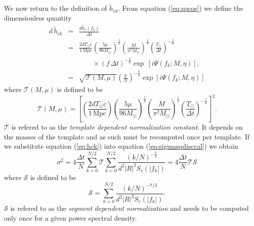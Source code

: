 We now return to the definition of $\tilde{h}_{ck}$.  From equation
(\ref{eq:spcos}) we define the dimensionless quantity
\begin{eqnarray}
\label{eq:hck}
d\,\tilde{h}_{ck} &=& \frac{d \tilde{h}_c(f_k)}{\Delta t} \\
&=& 
\frac{2dT_\odot c}{1\,\mathrm{Mpc}}
\left(\frac{5\mu}{96M_\odot}\right)^\frac{1}{2}
\left(\frac{M}{\pi^2M_\odot}\right)^\frac{1}{3}
\left(\frac{T_\odot}{\Delta t}\right)^{-\frac{1}{6}}\\
&&\quad\quad\times
\left( f\,\Delta t \right)^{-\frac{7}{6}}
\exp\,[i\Psi(f_k;M,\eta)], \nonumber \\
&=&
\sqrt{\mathcal{T}(M,\mu)}\left(\frac{k}{N}\right)^{-\frac{7}{6}}
\exp\left[i\Psi\left(f_k;M,\eta\right)\right]
\end{eqnarray}
where $\mathcal{T}(M,\mu)$ is defined to be
\begin{equation}
\mathcal{T}(M,\mu) = \left[
\left(\frac{2dT_\odot c}{1\,\mathrm{Mpc}}\right)
\left(\frac{5\mu}{96M_\odot}\right)^\frac{1}{2}
\left(\frac{M}{\pi^2M_\odot}\right)^\frac{1}{3}
\left(\frac{T_\odot}{\Delta t}\right)^{-\frac{1}{6}}
\right]^2.
\end{equation}
$\mathcal{T}$ is refered to as the \emph{template dependent normalization
constant}. It depends on the masses of the template and as such must be
recomputed once per template. If we substitute equation (\ref{eq:hck}) 
into equation (\ref{eq:sigmasqdisccal}) we obtain
\begin{equation}
\sigma^2 = 4 \frac{\Delta t}{N} \sum_{k=0}^{N/2} \mathcal{T} 
\sum_{k=0}^{N/2} 
\frac{\left({k}/{N}\right)^{-\frac{7}{3}}}
{d^2|R|^2S_v\left(\left|f_k\right|\right)}
= 4 \frac{\Delta t}{N} \mathcal{T} \mathcal{S}
\end{equation}
where $\mathcal{S}$ is defined to be
\begin{equation}
\mathcal{S} = 
\sum_{k=0}^{N/2} 
\frac{\left({k}/{N}\right)^{-7/3}}{d^2|R|^2S_v\left(\left|f_k\right|\right)}.
\end{equation}
$\mathcal{S}$ is refered to as the \emph{segment dependent normalization} and
needs to be computed only once for a given power spectral density.

